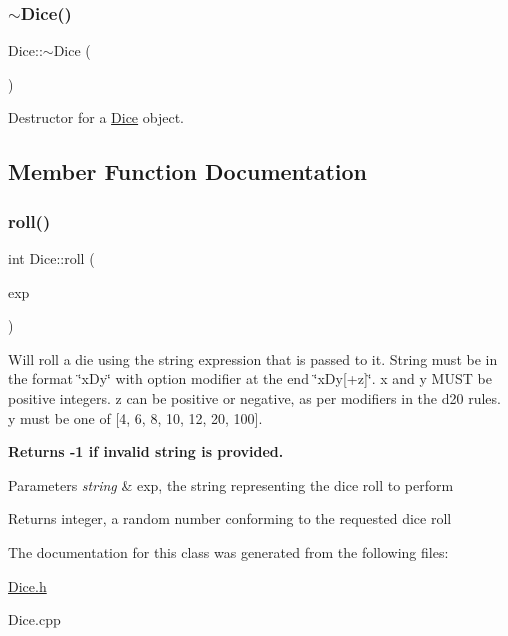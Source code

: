 \subsubsection{\texorpdfstring{$\sim$\+Dice()}{~Dice()}}
{\footnotesize\ttfamily Dice\+::$\sim$\+Dice (\begin{DoxyParamCaption}{ }\end{DoxyParamCaption})}

Destructor for a \hyperlink{class_dice}{Dice} object. 

\subsection{Member Function Documentation}
\hypertarget{class_dice_a0bc8f4b697804af0785f34b801cd6feb}{}\label{class_dice_a0bc8f4b697804af0785f34b801cd6feb} 
\subsubsection{\texorpdfstring{roll()}{roll()}}
{\footnotesize\ttfamily int Dice\+::roll (\begin{DoxyParamCaption}\item[{std\+::string}]{exp }\end{DoxyParamCaption})}

Will \textquotesingle{}roll\textquotesingle{} a die using the string expression that is passed to it. String must be in the format \char`\"{}x\+Dy\char`\"{} with option modifier at the end \char`\"{}x\+Dy\mbox{[}+z\mbox{]}\char`\"{}. x and y M\+U\+ST be positive integers. z can be positive or negative, as per modifiers in the d20 rules. y must be one of \mbox{[}4, 6, 8, 10, 12, 20, 100\mbox{]}.

{\bfseries Returns -\/1 if invalid string is provided.}

{\bfseries 
\begin{DoxyParams}{Parameters}
{\em string} & exp, the string representing the dice roll to perform \\
\hline
\end{DoxyParams}
\begin{DoxyReturn}{Returns}
integer, a random number conforming to the requested dice roll 
\end{DoxyReturn}
}

The documentation for this class was generated from the following files\+:\begin{DoxyCompactItemize}
\item 
\hyperlink{_dice_8h}{Dice.\+h}\item 
Dice.\+cpp\end{DoxyCompactItemize}

